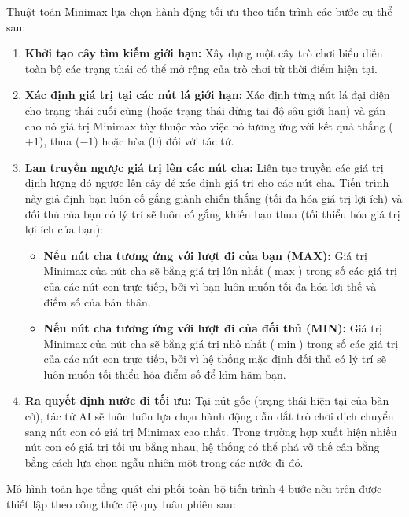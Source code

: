 Thuật toán Minimax lựa chọn hành động tối ưu theo tiến trình các bước cụ thể sau:
\begin{enumerate}
	\item \textbf{Khởi tạo cây tìm kiếm giới hạn:} Xây dựng một cây trò chơi biểu diễn toàn bộ các trạng thái có thể mở rộng của trò chơi từ thời điểm hiện tại.
	\item \textbf{Xác định giá trị tại các nút lá giới hạn:} Xác định từng nút lá đại diện cho trạng thái cuối cùng (hoặc trạng thái dừng tại độ sâu giới hạn) và gán cho nó giá trị Minimax tùy thuộc vào việc nó tương ứng với kết quả thắng ($+1$), thua ($-1$) hoặc hòa ($0$) đối với tác tử.
	\item \textbf{Lan truyền ngược giá trị lên các nút cha:} Liên tục truyền các giá trị định lượng đó ngược lên cây để xác định giá trị cho các nút cha. Tiến trình này giả định bạn luôn cố gắng giành chiến thắng (tối đa hóa giá trị lợi ích) và đối thủ của bạn có lý trí sẽ luôn cố gắng khiến bạn thua (tối thiểu hóa giá trị lợi ích của bạn):
	\begin{itemize}
		
		\item \textbf{Nếu nút cha tương ứng với lượt đi của bạn (MAX):} Giá trị Minimax của nút cha sẽ bằng giá trị lớn nhất ($\max$) trong số các giá trị của các nút con trực tiếp, bởi vì bạn luôn muốn tối đa hóa lợi thế và điểm số của bản thân.
		
		\item \textbf{Nếu nút cha tương ứng với lượt đi của đối thủ (MIN):} Giá trị Minimax của nút cha sẽ bằng giá trị nhỏ nhất ($\min$) trong số các giá trị của các nút con trực tiếp, bởi vì hệ thống mặc định đối thủ có lý trí sẽ luôn muốn tối thiểu hóa điểm số để kìm hãm bạn.
	\end{itemize}
	\item \textbf{Ra quyết định nước đi tối ưu:} Tại nút gốc (trạng thái hiện tại của bàn cờ), tác tử AI sẽ luôn luôn lựa chọn hành động dẫn dắt trò chơi dịch chuyển sang nút con có giá trị Minimax cao nhất. Trong trường hợp xuất hiện nhiều nút con có giá trị tối ưu bằng nhau, hệ thống có thể phá vỡ thế cân bằng bằng cách lựa chọn ngẫu nhiên một trong các nước đi đó.
\end{enumerate}

 Mô hình toán học tổng quát chi phối toàn bộ tiến trình 4 bước nêu trên được thiết lập theo công thức đệ quy luân phiên sau:

